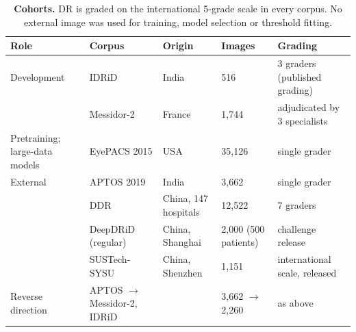 \begin{table}[t]
\caption{\textbf{Cohorts.} DR is graded on the international 5-grade scale
in every corpus. No external image was used for training, model selection or
threshold fitting.}\label{tab:cohorts}
\centering\footnotesize\setlength{\tabcolsep}{3pt}
\begin{tabular}{@{}p{2.3cm}p{3.1cm}p{2.4cm}p{2.3cm}p{2.7cm}@{}}
\toprule
Role & Corpus & Origin & Images & Grading \\
\midrule
Development & IDRiD & India & 516 & 3 graders (published grading) \\
 & Messidor-2 & France & 1,744 & adjudicated by 3 specialists \\
Pretraining; large-data models & EyePACS 2015 & USA & 35,126 & single grader \\
External & APTOS 2019 & India & 3,662 & single grader \\
 & DDR & China, 147 hospitals & 12,522 & 7 graders \\
 & DeepDRiD (regular) & China, Shanghai & 2,000 (500 patients) & challenge release \\
 & SUSTech-SYSU & China, Shenzhen & 1,151 & international scale, released \\
Reverse direction & APTOS $\rightarrow$ Messidor-2, IDRiD &  & 3,662 $\rightarrow$ 2,260 & as above \\
\bottomrule
\end{tabular}
\end{table}
